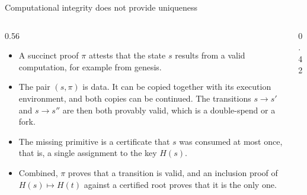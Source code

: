 \documentclass[aspectratio=169,10pt]{beamer}
\begin{document}
\begin{frame}{Computational integrity does not provide uniqueness}
\begin{columns}[c]
\begin{column}{0.56\textwidth}
\small
\begin{itemize}
  \item A succinct proof $\pi$ attests that the state $s$ results from a valid computation, for example from genesis.
  \item The pair $(s,\pi)$ is data. It can be copied together with its execution environment, and both copies can be continued. The transitions $s \to s'$ and $s \to s''$ are then both provably valid, which is a double-spend or a fork.
  \item The missing primitive is a certificate that $s$ was consumed at most once, that is, a single assignment to the key $H(s)$.
  \item Combined, $\pi$ proves that a transition is valid, and an inclusion proof of $H(s) \mapsto H(t)$ against a certified root proves that it is the only one.
\end{itemize}
\end{column}
\begin{column}{0.42\textwidth}
\centering
{}
\end{column}
\end{columns}
\end{frame}
\end{document}
